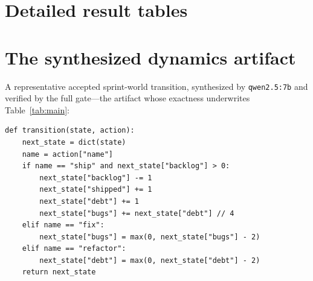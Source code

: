 \documentclass[11pt]{article}
\begin{document}
\section{Detailed result tables}\label{app:tables}

\begin{table}[htb]\centering\small

\caption{E2 + E16: synthesis reliability by generator scale and family.
Qwen rows: five compilation attempts per world; Llama/Gemma rows: three per
world. Maximum four verify--repair iterations each; wall-clock includes all
iterations.}
\label{tab:synthesis-app}
\end{table}

\begin{table}[htb]\centering\small

\caption{E18: filter-vs-repair decomposition of the full verification gate
(3B generator, eight paired high-temperature attempts per regime).}
\label{tab:repair-app}
\end{table}

\begin{table}[htb]\centering\small

\caption{E19: exact transition accuracy on the branch-covering probe suite
across a 1$\times$/10$\times$/100$\times$ scale ladder.}
\label{tab:ladder-app}
\end{table}

\begin{table}[htb]\centering\small

\caption{E9: tuning-strategy comparison on the triage auto-configuration
problem; ten seeds per strategy, \TuningBudget-trial budget.}
\label{tab:tuning-app}
\end{table}

\section{The synthesized dynamics artifact}\label{app:figs}
A representative accepted sprint-world transition, synthesized by
\texttt{qwen2.5:7b} and verified by the full gate---the artifact whose
exactness underwrites Table~\ref{tab:main}:

\begin{tcolorbox}[policycard, cardcol=cardteal,
  title=Accepted \texttt{transition()} (verbatim)]
\begin{lstlisting}[style=housespecyamlbare]
def transition(state, action):
    next_state = dict(state)
    name = action["name"]
    if name == "ship" and next_state["backlog"] > 0:
        next_state["backlog"] -= 1
        next_state["shipped"] += 1
        next_state["debt"] += 1
        next_state["bugs"] += next_state["debt"] // 4
    elif name == "fix":
        next_state["bugs"] = max(0, next_state["bugs"] - 2)
    elif name == "refactor":
        next_state["debt"] = max(0, next_state["debt"] - 2)
    return next_state
\end{lstlisting}
\end{tcolorbox}
\end{document}
